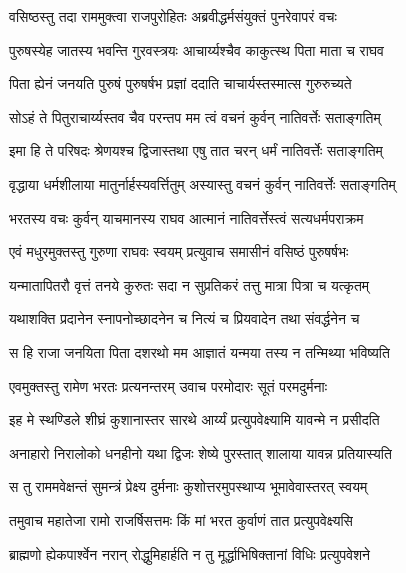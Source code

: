 
\twolineshloka
{वसिष्ठस्तु तदा राममुक्त्वा राजपुरोहितः}
{अब्रवीद्धर्मसंयुक्तं पुनरेवापरं वचः} %

\twolineshloka
{पुरुषस्येह जातस्य भवन्ति गुरवस्त्रयः}
{आचार्य्यश्चैव काकुत्स्थ पिता माता च राघव} %

\twolineshloka
{पिता ह्येनं जनयति पुरुषं पुरुषर्षभ}
{प्रज्ञां ददाति चाचार्यस्तस्मात्स गुरुरुच्यते} %

\twolineshloka
{सोऽहं ते पितुराचार्य्यस्तव चैव परन्तप}
{मम त्वं वचनं कुर्वन् नातिवर्त्तेः सताङ्गतिम्} %

\twolineshloka
{इमा हि ते परिषदः श्रेणयश्च द्विजास्तथा}
{एषु तात चरन् धर्मं नातिवर्त्तेः सताङ्गतिम्} %

\twolineshloka
{वृद्धाया धर्मशीलाया मातुर्नार्हस्यवर्त्तितुम्}
{अस्यास्तु वचनं कुर्वन् नातिवर्त्तेः सताङ्गतिम्} %

\twolineshloka
{भरतस्य वचः कुर्वन् याचमानस्य राघव}
{आत्मानं नातिवर्त्तेस्त्वं सत्यधर्मपराक्रम} %

\twolineshloka
{एवं मधुरमुक्तस्तु गुरुणा राघवः स्वयम्}
{प्रत्युवाच समासीनं वसिष्ठं पुरुषर्षभः} %

\twolineshloka
{यन्मातापितरौ वृत्तं तनये कुरुतः सदा}
{न सुप्रतिकरं तत्तु मात्रा पित्रा च यत्कृतम्} %

\twolineshloka
{यथाशक्ति प्रदानेन स्नापनोच्छादनेन च}
{नित्यं च प्रियवादेन तथा संवर्द्धनेन च} %

\twolineshloka
{स हि राजा जनयिता पिता दशरथो मम}
{आज्ञातं यन्मया तस्य न तन्मिथ्या भविष्यति} %

\twolineshloka
{एवमुक्तस्तु रामेण भरतः प्रत्यनन्तरम्}
{उवाच परमोदारः सूतं परमदुर्मनाः} %

\twolineshloka
{इह मे स्थण्डिले शीघ्रं कुशानास्तर सारथे}
{आर्य्यं प्रत्युपवेक्ष्यामि यावन्मे न प्रसीदति} %

\twolineshloka
{अनाहारो निरालोको धनहीनो यथा द्विजः}
{शेष्ये पुरस्तात् शालाया यावन्न प्रतियास्यति} %

\twolineshloka
{स तु राममवेक्षन्तं सुमन्त्रं प्रेक्ष्य दुर्मनाः}
{कुशोत्तरमुपस्थाप्य भूमावेवास्तरत् स्वयम्} %

\twolineshloka
{तमुवाच महातेजा रामो राजर्षिसत्तमः}
{किं मां भरत कुर्वाणं तात प्रत्युपवेक्ष्यसि} %

\twolineshloka
{ब्राह्मणो ह्येकपार्श्वेन नरान् रोद्धुमिहार्हति}
{न तु मूर्द्धाभिषिक्तानां विधिः प्रत्युपवेशने} %

